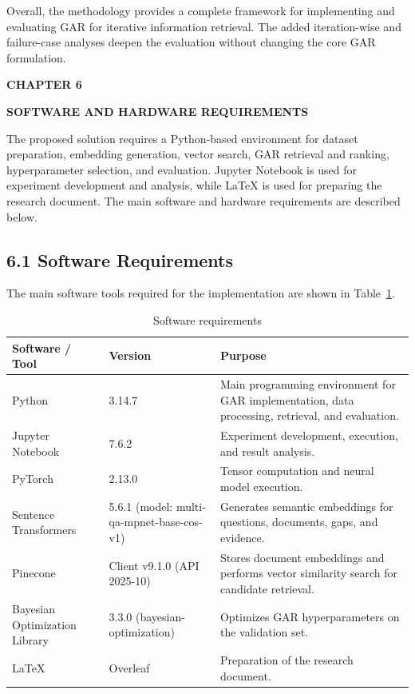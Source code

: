 \documentclass[12pt,a4paper]{report}
\newcommand{\chaptertitle}[2]{
    \begin{center}
        {\fontsize{18}{21}\selectfont\bfseries CHAPTER #1\par}
        \vspace{0.10in}
        {\fontsize{18}{21}\selectfont\bfseries #2\par}
    \end{center}
    \vspace{0.12in}
}
\begin{document}
Overall, the methodology provides a complete framework for implementing and evaluating GAR for iterative information retrieval. The added iteration-wise and failure-case analyses deepen the evaluation without changing the core GAR formulation.

\clearpage


\setcounter{table}{0}
\renewcommand{\thetable}{6.\arabic{table}}


\chaptertitle{6}{SOFTWARE AND HARDWARE REQUIREMENTS}

\justifying

The proposed solution requires a Python-based environment for dataset preparation, embedding generation, vector search, GAR retrieval and ranking, hyperparameter selection, and evaluation. Jupyter Notebook is used for experiment development and analysis, while LaTeX is used for preparing the research document. The main software and hardware requirements are described below.

\subsection*{6.1 Software Requirements}

The main software tools required for the implementation are shown in Table~\ref{tab:software-requirements}.

\begin{table}[H]
\centering
\caption{Software requirements}
\label{tab:software-requirements}
\renewcommand{\arraystretch}{1.2}
\begin{tabular}{|p{1.65in}|p{1.45in}|p{2.95in}|}
\hline
\textbf{Software / Tool} & \textbf{Version} & \textbf{Purpose} \\ \hline
Python & 3.14.7 & Main programming environment for GAR implementation, data processing, retrieval, and evaluation. \\ \hline
Jupyter Notebook & 7.6.2 & Experiment development, execution, and result analysis. \\ \hline
PyTorch & 2.13.0 & Tensor computation and neural model execution. \\ \hline
Sentence Transformers & 5.6.1 (model: multi-qa-mpnet-base-cos-v1) & Generates semantic embeddings for questions, documents, gaps, and evidence. \\ \hline
Pinecone & Client v9.1.0 (API 2025-10) & Stores document embeddings and performs vector similarity search for candidate retrieval. \\ \hline
Bayesian Optimization Library & 3.3.0 (bayesian-optimization) & Optimizes GAR hyperparameters on the validation set. \\ \hline
LaTeX & Overleaf & Preparation of the research document. \\ \hline
\end{tabular}
\end{table}
\end{document}
